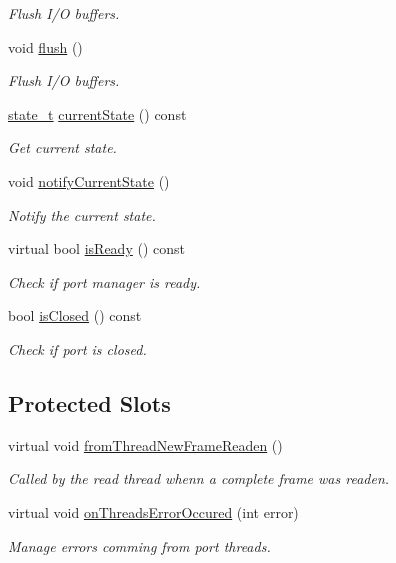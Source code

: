 \begin{DoxyCompactItemize}
\begin{DoxyCompactList}\small\item\em Flush I/\-O buffers. \end{DoxyCompactList}\item 
void \hyperlink{classmdt_port_manager_a3eab774008d7530ae341ce9c38265d65}{flush} ()
\begin{DoxyCompactList}\small\item\em Flush I/\-O buffers. \end{DoxyCompactList}\item 
\hyperlink{classmdt_port_manager_a9448339d7f08ca5e18b904df25b382da}{state\-\_\-t} \hyperlink{classmdt_port_manager_a59241d9e6b6ee71e6c1aeb3e6c0ca81a}{current\-State} () const 
\begin{DoxyCompactList}\small\item\em Get current state. \end{DoxyCompactList}\item 
void \hyperlink{classmdt_port_manager_a0c460b47b12e38e708321be79f6343d8}{notify\-Current\-State} ()
\begin{DoxyCompactList}\small\item\em Notify the current state. \end{DoxyCompactList}\item 
virtual bool \hyperlink{classmdt_port_manager_a6dc2798324521d177fb8f79d4f6c5f0f}{is\-Ready} () const 
\begin{DoxyCompactList}\small\item\em Check if port manager is ready. \end{DoxyCompactList}\item 
bool \hyperlink{classmdt_port_manager_aeecbec49376838ab3547729636166d97}{is\-Closed} () const 
\begin{DoxyCompactList}\small\item\em Check if port is closed. \end{DoxyCompactList}\end{DoxyCompactItemize}
\subsection*{Protected Slots}
\begin{DoxyCompactItemize}
\item 
virtual void \hyperlink{classmdt_port_manager_a4fcc8f0699b655156e661bb3de6056cc}{from\-Thread\-New\-Frame\-Readen} ()
\begin{DoxyCompactList}\small\item\em Called by the read thread whenn a complete frame was readen. \end{DoxyCompactList}\item 
virtual void \hyperlink{classmdt_port_manager_a7e45b8e3475e5182ed12218616664d07}{on\-Threads\-Error\-Occured} (int error)
\begin{DoxyCompactList}\small\item\em Manage errors comming from port threads. \end{DoxyCompactList}\end{DoxyCompactItemize}

